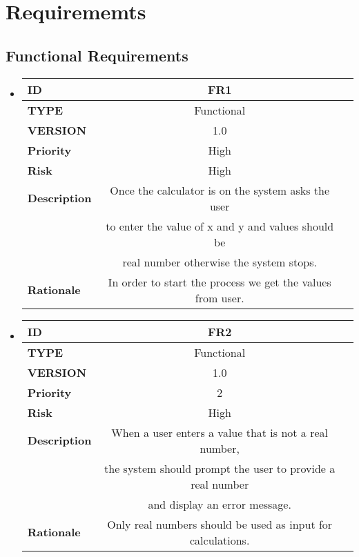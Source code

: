 \documentclass[a4paper,12pt]{article}
\begin{document}
\section{Requirememts}

\subsection{Functional Requirements}
\begin{itemize}


\item	\begin{tabular}{|| l ||c  | c||}
		\hline \hline
		\textbf{ID} & FR1  \\ 
		\hline
		\textbf{TYPE} & Functional   \\
		\hline
		\textbf{VERSION} & 1.0  \\ 
		\hline
		\textbf{Priority} & High  \\
		\hline
		\textbf{Risk} & High  \\ 
		\hline
		\textbf{Description} & Once the calculator is on the system asks the user\\  & to enter the value of x and y and values should be \\ & real number otherwise the system stops.  \\
		\hline
		\textbf{Rationale} & In order to start the process we get the values from user.   \\
		\hline
		
	\end{tabular}
	
	\newpage
	
\item		\begin{tabular}{|| l ||c  | c||}
		\hline \hline
		\textbf{ID} & FR2  \\ 
		\hline
		\textbf{TYPE} & Functional   \\
		\hline
		\textbf{VERSION} & 1.0  \\ 
		\hline
		\textbf{Priority} & 2  \\
		\hline
		\textbf{Risk} & High  \\ 
		\hline
		\textbf{Description} & When a user enters a value that is not a real number, \\&the system should prompt the user to provide a real number\\& and display an error message.\\
		\hline
		\textbf{Rationale} & Only real numbers should be used as input for calculations.   \\
		\hline
		

\end{tabular}
\end{itemize}
\end{document}
